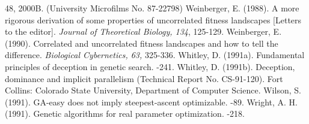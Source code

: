 \begin{thereferences}
{	48,} 2000B. (University Microfilms No. 87-22798)
 Weinberger, E. (1988).  A more rigorous derivation of some
	properties of uncorrelated fitness landscapes [Letters to the
	editor].  {\em Journal of Theoretical Biology, 134}, 125-129.
 Weinberger, E. (1990). Correlated and uncorrelated
	fitness landscapes and how to tell the difference.
	{\em Biological Cybernetics, 63,} 325-336.
 Whitley, D. (1991a). Fundamental principles of
	deception in genetic search.  
	-241.
 Whitley, D. (1991b).  Deception, dominance and
	implicit parallelism (Technical Report No. CS-91-120).
	Fort Collins: Colorado State University, Department of
	Computer Science.
 Wilson, S. (1991). GA-easy does not imply
	steepest-ascent optimizable.
	-89.
 Wright, A. H. (1991).
	Genetic algorithms for real parameter optimization.
	-218.
\end{thereferences}


